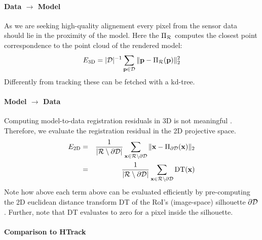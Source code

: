 

\paragraph{Data $\rightarrow$ Model}
As we are seeking high-quality alignement every pixel from the sensor data should lie in the proximity of the model. Here the $\Pi_{\mathcal{R}}$ computes the closest point correspondence to the point cloud of the rendered model:
\begin{equation}
E_\text{3D} = |\mathcal{D}|^{-1} \sum_{\mathbf{p} \in \mathcal{D}} \| \mathbf{p} - \Pi_{\mathcal{R}}(\mathbf{p}) \|_2^2
\label{eq:metric1}
\end{equation}
Differently from tracking these can be fetched with a kd-tree.

\paragraph{Model $\rightarrow$ Data}
Computing model-to-data registration residuals in 3D is not meaningful . Therefore, we evaluate the registration residual in the 2D projective space. 
\begin{eqnarray}
E_\text{2D} 
&=& \frac{1}{|\mathcal{R} \setminus \partial\mathcal{D}|} 
\sum_{\mathbf{x} \in \mathcal{R} \setminus \partial\mathcal{D}} \| \mathbf{x} - \Pi_{\partial\mathcal{D}}(\mathbf{x}) \|_2 \\ 
&=& \frac{1}{|\mathcal{R} \setminus \partial\mathcal{D}|} 
\sum_{\mathbf{x} \in \mathcal{R} \setminus \partial\mathcal{D}} \text{DT}(\mathbf{x})
\label{eq:metric2}
\end{eqnarray}
Note how above each term above can be evaluated efficiently by pre-computing the 2D euclidean distance transform DT of the RoI's (image-space) silhouette $\partial \mathcal{D}$. Further, note that DT evaluates to zero for a pixel inside the silhouette. 



\paragraph{Comparison to HTrack}


